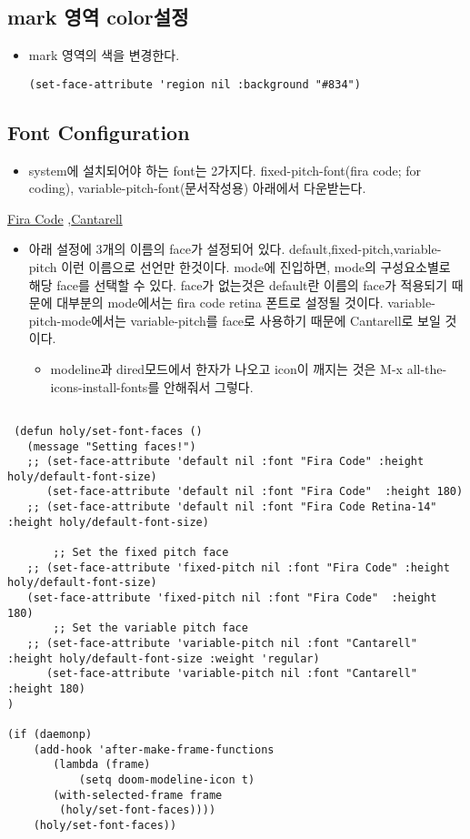 \documentclass[11pt]{article}
\begin{document}
\subsection*{mark 영역 color설정}
\label{sec:orgb0be25a}
\begin{itemize}
\item mark 영역의 색을 변경한다.
\begin{verbatim}
(set-face-attribute 'region nil :background "#834")
\end{verbatim}
\end{itemize}
\subsection*{Font Configuration}
\label{sec:org9d3278c}
\begin{itemize}
\item system에 설치되어야 하는 font는 2가지다. fixed-pitch-font(fira code;
for coding), variable-pitch-font(문서작성용) 아래에서 다운받는다.
\end{itemize}
\href{https://github.com/tonsky/FiraCode}{Fira Code} ,\href{https://fonts.google.com/specimen/Cantarell}{Cantarell} 
\begin{itemize}
\item 아래 설정에 3개의 이름의 face가 설정되어
있다. default,fixed-pitch,variable-pitch 이런 이름으로 선언만
한것이다. mode에 진입하면, mode의 구성요소별로 해당 face를 선택할 수
있다. face가 없는것은 default란 이름의 face가 적용되기 때문에
대부분의 mode에서는 fira code retina 폰트로 설정될
것이다. variable-pitch-mode에서는 variable-pitch를 face로 사용하기
때문에 Cantarell로 보일 것이다.
\begin{itemize}
\item modeline과 dired모드에서 한자가 나오고 icon이 깨지는 것은 M-x all-the-icons-install-fonts를 안해줘서 그렇다.
\end{itemize}
\end{itemize}
\begin{verbatim}

 (defun holy/set-font-faces ()		
   (message "Setting faces!")
   ;; (set-face-attribute 'default nil :font "Fira Code" :height holy/default-font-size)
      (set-face-attribute 'default nil :font "Fira Code"  :height 180)
   ;; (set-face-attribute 'default nil :font "Fira Code Retina-14" :height holy/default-font-size)

       ;; Set the fixed pitch face
   ;; (set-face-attribute 'fixed-pitch nil :font "Fira Code" :height holy/default-font-size) 
   (set-face-attribute 'fixed-pitch nil :font "Fira Code"  :height 180)
       ;; Set the variable pitch face
   ;; (set-face-attribute 'variable-pitch nil :font "Cantarell" :height holy/default-font-size :weight 'regular)
      (set-face-attribute 'variable-pitch nil :font "Cantarell"  :height 180)
)

(if (daemonp)
    (add-hook 'after-make-frame-functions
       (lambda (frame)
	       (setq doom-modeline-icon t)
	   (with-selected-frame frame
		(holy/set-font-faces))))
    (holy/set-font-faces))

\end{verbatim}
\end{document}
